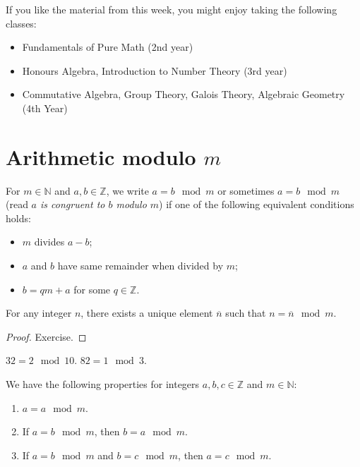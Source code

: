 \documentclass[11pt,dvipsnames]{book}
\numberwithin{figure}{section} %
\numberwithin{table}{section} %
\begin{document}
If you like the material from this week, you might enjoy taking the following classes:

\begin{itemize}
\item Fundamentals of Pure Math (2nd year)
\item Honours Algebra, Introduction to Number Theory (3rd year)
\item Commutative Algebra, Group Theory, Galois Theory, Algebraic Geometry (4th Year)
\end{itemize}

\section{Arithmetic modulo $m$}

\begin{definition}
\label{d:mod}
For $m\in \mathbb{N}$ and $a,b\in \mathbb{Z}$, we write $a = b\mod m$ or sometimes $a  = b\mod m$ (read {\it $a$ is congruent to $b$ modulo $m$}) if one of the following equivalent conditions holds:

\begin{itemize}
\item $m$ divides $a-b$;
\item $a$ and $b$ have same remainder when divided by $m$;
\item $b=qm+a$ for some $q\in \mathbb{Z}$.
\end{itemize}
\end{definition}

\begin{proposition}
For any integer $n$, there exists a unique element $\overline{n}$ such that $n = \overline{n} \mod m$.
\end{proposition}
\begin{proof}
Exercise.
\end{proof}

\begin{example}
$32=2\mod 10$. $82=1 \mod 3$.
\end{example}

\begin{theorem}
We have the following properties for integers $a,b,c\in\mathbb{Z}$ and $m\in\mathbb{N}$:
\begin{enumerate}[label=(\alph*)]
\item $a = a\mod m$.
\item If $a = b\mod m$, then $b = a\mod m$.
\item If $a = b\mod m$ and $b = c\mod m$, then $a = c\mod m$.
\end{enumerate}
\end{theorem}
\end{document}

